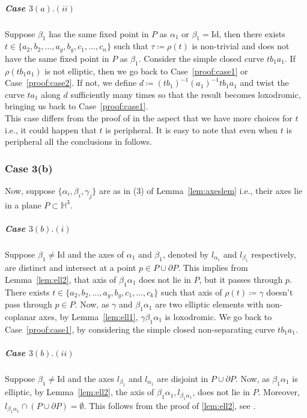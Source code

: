 \subparagraph{Case $3(a).(ii)$} \label{proof:case3aii} 

Suppose $\beta_1$ has the same fixed point in $P$ as $\alpha_1$ or $\beta_1 = \text{Id}$, then there exists $t \in \{a_2,b_2, \ldots, a_g,b_g,c_1,\ldots,c_n\}$ such that $\tau \coloneqq \rho(t)$ is non-trivial and does not have the same fixed point in $P$ as $\beta_1$. Consider the simple closed curve $tb_1a_1$. If $\rho(tb_1a_1)$ is not elliptic, then we go back to Case~\ref{proof:case1} or Case~\ref{proof:case2}. If not, we define $d \coloneqq (tb_1)^{-1}(a_1)^{-1}tb_1a_1$ and twist the curve $ta_1$ along $d$ sufficiently many times so that the result becomes loxodromic, bringing us back to Case~\ref{proof:case1}.\\

This case differs from the proof of \cite{GKM} in the aspect that we have more choices for $t$ i.e., it could happen that $t$ is peripheral. It is easy to note that even when $t$ is peripheral all the conclusions in \cite{GKM} follows.

\subsubsection{Case 3(b)}\label{proof:case3b} Now, suppose $\{\alpha_i, \beta_i, \gamma_j\}$ are as in (3) of Lemma~\ref{lem:axeslem} i.e., their axes lie in a plane $P \subset \mathbb{H}^3$. \\

\subparagraph{Case $3(b).(i)$} Suppose $\beta_1 \neq \text{Id}$ and the axes of $\alpha_1$ and $\beta_1$, denoted by $l_{\alpha_1} $ and $ l_{\beta_1}$ respectively, are distinct and intersect at a point $p \in P \cup \partial P$. This implies from Lemma~\ref{lem:ell2}, that axis of $\beta_1 \alpha_1$ does not lie in $P$, but it passes through $p$. There exists $t \in \{a_2,b_2,\ldots,a_g,b_g,c_1,\ldots,c_k\}$ such that axis of $\rho(t) \coloneqq \gamma$ doesn't pass through $p \in P$. Now, as $\gamma$ and $\beta_1 \alpha_1$ are two elliptic elements with non-coplanar axes, by Lemma~\ref{lem:ell1}, $\gamma \beta_1 \alpha_1$ is loxodromic. We go back to Case~\ref{proof:case1}, by considering the simple closed non-separating curve $tb_1a_1$.\\

\subparagraph{Case $3(b).(ii)$} Suppose $\beta_1 \neq \text{Id}$ and the axes $l_{\beta_1}$ and $l_{\alpha_1}$ are disjoint in $P \cup \partial P$. Now, as $\beta_1 \alpha_1$ is elliptic, by Lemma~\ref{lem:ell2}, the axis of $\beta_1\alpha_1, l_{\beta_1\alpha_1}$, does not lie in $P$. Moreover, $l_{\beta_1 \alpha_1} \cap (P \cup \partial P) = \emptyset$. This follows from the proof of \ref{lem:ell2}, see \cite[Lemma 3.4.3]{GKM}. 

